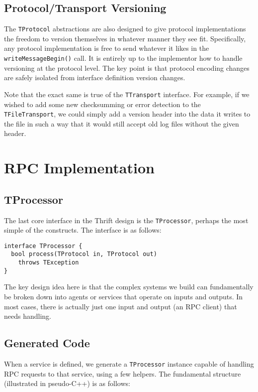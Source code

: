\documentclass[nocopyrightspace,blockstyle]{sigplanconf}
\begin{document}
\subsection{Protocol/Transport Versioning}
The \texttt{TProtocol} abstractions are also designed to give protocol
implementations the freedom to version themselves in whatever manner they
see fit. Specifically, any protocol implementation is free to send whatever
it likes in the \texttt{writeMessageBegin()} call. It is entirely up to the
implementor how to handle versioning at the protocol level. The key point is
that protocol encoding changes are safely isolated from interface definition
version changes.

Note that the exact same is true of the \texttt{TTransport} interface. For
example, if we wished to add some new checksumming or error detection to the
\texttt{TFileTransport}, we could simply add a version header into the
data it writes to the file in such a way that it would still accept old
log files without the given header.

\section{RPC Implementation}

\subsection{TProcessor}

The last core interface in the Thrift design is the \texttt{TProcessor},
perhaps the most simple of the constructs. The interface is as follows:

\begin{verbatim}
interface TProcessor {
  bool process(TProtocol in, TProtocol out)
    throws TException
}
\end{verbatim}

The key design idea here is that the complex systems we build can fundamentally
be broken down into agents or services that operate on inputs and outputs. In
most cases, there is actually just one input and output (an RPC client) that
needs handling.

\subsection{Generated Code}

When a service is defined, we generate a
\texttt{TProcessor} instance capable of handling RPC requests to that service,
using a few helpers. The fundamental structure (illustrated in pseudo-C++) is
as follows:
\end{document}
